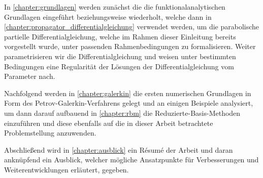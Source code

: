 \documentclass[../main.tex]{subfiles}
\begin{document}
In \cref{chapter:grundlagen} werden zunächst die die funktionalanalytischen Grundlagen eingeführt beziehungsweise wiederholt, welche dann in \cref{chapter:propagator_differentialgleichung} verwendet werden, um die parabolische partielle Differentialgleichung, welche im Rahmen dieser Einleitung bereits vorgestellt wurde, unter passenden Rahmenbedingungen zu formalisieren.
Weiter parametrisieren wir die Differentialgleichung und weisen unter bestimmten Bedingungen eine Regularität der Lösungen der Differentialgleichung vom Parameter nach.

Nachfolgend werden in \cref{chapter:galerkin} die ersten numerischen Grundlagen in Form des Petrov-Galerkin-Verfahrens gelegt und an einigen Beispiele analysiert, um dann darauf aufbauend in \cref{chapter:rbm} die Reduzierte-Basis-Methoden einzuführen und diese ebenfalls auf die in dieser Arbeit betrachtete Problemstellung anzuwenden.

Abschließend wird in \cref{chapter:ausblick} ein Résumé der Arbeit und daran anknüpfend ein Ausblick, welcher mögliche Ansatzpunkte für Verbesserungen und Weiterentwicklungen erläutert, gegeben.
\end{document}
